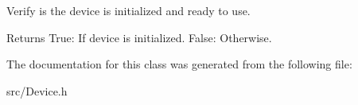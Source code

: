Verify is the device is initialized and ready to use. 

\begin{DoxyReturn}{Returns}
True\+: If device is initialized. False\+: Otherwise. 
\end{DoxyReturn}


The documentation for this class was generated from the following file\+:\begin{DoxyCompactItemize}
\item 
src/Device.\+h\end{DoxyCompactItemize}

